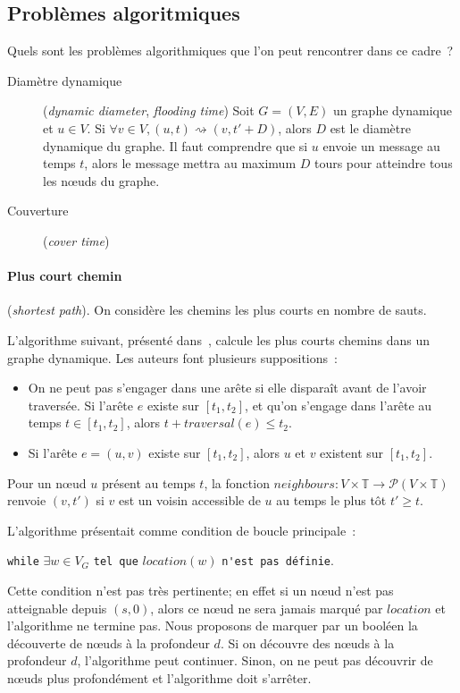 \documentclass[12pt,a4paper]{article}
\begin{document}
\subsection{Problèmes algoritmiques}

Quels sont les problèmes algorithmiques que l'on peut rencontrer dans
ce cadre~?

\begin{description}
\item[Diamètre dynamique] (\textit{dynamic diameter}, \textit{flooding
    time}) Soit \(G = (V, E)\) un graphe dynamique et \(u \in V\). Si
  \(\forall v \in V, (u, t) \rightsquigarrow (v, t' + D)\), alors
  \(D\) est le diamètre dynamique du graphe. Il faut comprendre que si
  \(u\) envoie un message au temps \(t\), alors le message mettra au
  maximum \(D\) tours pour atteindre tous les nœuds du graphe.
\item[Couverture] (\textit{cover time})
\end{description}

\paragraph{Plus court chemin}
(\textit{shortest path}). On considère les chemins les plus courts en
nombre de sauts.

L'algorithme suivant, présenté dans~\cite{xuan2003computing}, calcule
les plus courts chemins dans un graphe dynamique. Les auteurs font
plusieurs suppositions~:
\begin{itemize}
\item On ne peut pas s'engager dans une arête si elle disparaît avant
  de l'avoir traversée. Si l'arête \(e\) existe sur \([t_1, t_2]\), et
  qu'on s'engage dans l'arête au temps \(t \in [t_1, t_2]\), alors
  \(t + traversal(e) \leq t_2\).
\item Si l'arête \(e = (u, v)\) existe sur \([t_1, t_2]\), alors \(u\)
  et \(v\) existent sur \([t_1, t_2]\).
\end{itemize}

Pour un nœud \(u\) présent au temps \(t\), la fonction
\(neighbours : V \times \mathbb{T} \to \mathcal{P}(V \times
\mathbb{T})\) renvoie \((v, t')\) si \(v\) est un voisin accessible de
\(u\) au temps le plus tôt \(t' \geq t\).

L'algorithme présentait comme condition de boucle principale~:
\begin{center}
\verb|while| \(\exists w \in V_G\) \verb|tel que| \(location(w)\)
\verb|n'est pas définie|.
\end{center}
Cette condition n'est pas très pertinente;
en effet si un nœud n'est pas atteignable depuis \((s, 0)\), alors ce
nœud ne sera jamais marqué par \(location\) et l'algorithme ne termine
pas. Nous proposons de marquer par un booléen la découverte de nœuds à
la profondeur \(d\). Si on découvre des nœuds à la profondeur \(d\),
l'algorithme peut continuer. Sinon, on ne peut pas découvrir de nœuds
plus profondément et l'algorithme doit s'arrêter.\\
\end{document}
